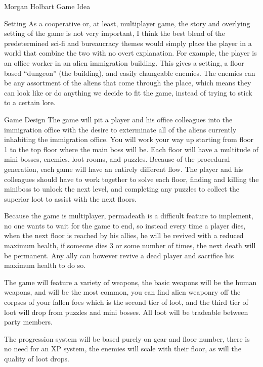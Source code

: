 \documentclass[12pt]{report}
\begin{document}
\begin{section}{Morgan Holbart Game Idea}
\begin{subsection}{Setting}
As a cooperative or, at least, multiplayer game, the story and overlying
setting of the game is not very important, I think the best blend of the
predetermined sci-fi and bureaucracy themes would simply place the player
in a world that combine the two with no overt explanation. For example,
the player is an office worker in an alien immigration building.
This gives a setting, a floor based ``dungeon'' (the building), and easily
changeable enemies. The enemies can be any assortment of the aliens that
come through the place, which means they can look like or do anything we
decide to fit the game, instead of trying to stick to a certain lore.
\end{subsection}

\begin{subsection}{Game Design}
The game will pit a player and his office colleagues into the immigration
office with the desire to exterminate all of the aliens currently inhabiting
the immigration office. You will work your way up starting from floor 1 to
the top floor where the main boss will be. Each floor will have a multitude
of mini bosses, enemies, loot rooms, and puzzles. Because of the procedural
generation, each game will have an entirely different flow. The player and
his colleagues should have to work together to solve each floor, finding and
killing the miniboss to unlock the next level, and completing any puzzles
to collect the superior loot to assist with the next floors.

Because the game is multiplayer, permadeath is a difficult feature to
implement, no one wants to wait for the game to end, so instead every time a
player dies, when the next floor is reached by his allies, he will be
revived with a reduced maximum health, if someone dies 3 or some number of
times, the next death will be permanent. Any ally can however revive a dead
player and sacrifice his maximum health to do so.

The game will feature a variety of weapons, the basic weapons will be the
human weapons, and will be the most common, you can find alien weaponry off
the corpses of your fallen foes which is the second tier of loot, and the
third tier of loot will drop from puzzles and mini bosses. All loot will be
tradeable between party members.

The progression system will be based purely on gear and floor number, there
is no need for an XP system, the enemies will scale with their floor, as
will the quality of loot drops.
\end{subsection}


\end{section}
\end{document}
